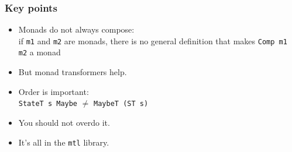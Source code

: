 \documentclass[pdftex,aspectratio=169]{beamer}
\begin{document}
\begin{frame}
  \frametitle{Key points}
  \begin{itemize}[<+->]
  \item Monads do not always compose:\\ if \lstinline{m1} and
    \lstinline{m2} are monads, 
    there is no general definition that makes \lstinline{Comp m1 m2} a
    monad 
  \item But monad transformers help.
  \item Order is important:\\
    \lstinline{StateT s Maybe} $\ne$ \lstinline{MaybeT (ST s)}
  \item You should not overdo it.
  \item It's all in the \lstinline{mtl} library.
  \end{itemize}
\end{frame}
\end{document}
